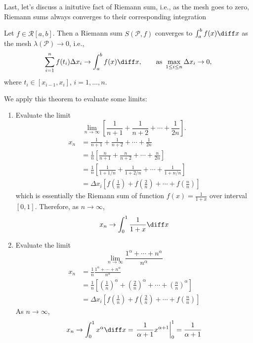 Last, let's discuss a initutive fact of Riemann sum, i.e., as the mesh goes to zero, Riemann sums always converges  to their corresponding integration
\begin{theorem}
Let $f\in\mathcal{R}[a,b]$. Then a Riemann sum $S(\mathcal{P},f)$ converges to $\int_a^bf(x)\diff x$ as the mesh $\lambda(\mathcal{P})\to0$, i.e.,
\[
\sum_{i=1}^nf(t_i)\Delta x_i\to\int_a^bf(x)\diff x,\qquad
\mbox{as }\max_{1\le i\le n}\Delta x_i\to0,
\]
where $t_i\in[x_{i-1},x_i]$, $i=1,\dots,n$.
\end{theorem}
We apply this theorem to evaluate some limits:
\begin{example}
\begin{enumerate}
\item
Evaluate the limit
\[
\lim_{n\to\infty}\left[\frac{1}{n+1}+\frac{1}{n+2}+\cdots+\frac{1}{2n}\right].
\]
\begin{align*}
x_n&=\frac{1}{n+1}+\frac{1}{n+2}+\cdots+\frac{1}{2n}\\
&=\frac{1}{n}\left[\frac{n}{n+1}+\frac{n}{n+2}+\cdots+\frac{n}{2n}\right]\\
&=\frac{1}{n}\left[
\frac{1}{1+1/n}+\frac{1}{1+2/n}+\cdots+\frac{1}{1+n/n}
\right]\\
&=\Delta x_i\left[
f(\frac{1}{n})+f(\frac{2}{n})+\cdots+f(\frac{n}{n})
\right]
\end{align*}
which is essentially the Riemann sum of function $f(x)=\frac{1}{1+x}$ over interval $[0,1]$. Therefore, as $n\to\infty$,
\[
x_n\to\int_0^1\frac{1}{1+x}\diff x
\]
\item
Evaluate the limit
\[
\lim_{n\to\infty}\frac{1^\alpha+\cdots+n^\alpha}{n^{\alpha}}
\]
\begin{align*}
x_n&=\frac{1}{n}\frac{1^\alpha+\cdots+n^\alpha}{n^{\alpha}}\\
&=\frac{1}{n}\left[(\frac{1}{n})^\alpha+(\frac{2}{n})^\alpha+\cdots+(\frac{n}{n})^\alpha\right]\\
&=\Delta x_i\left[
f(\frac{1}{n})+f(\frac{2}{n})+\cdots+f(\frac{n}{n})
\right]
\end{align*}
As $n\to\infty$,
\[
x_n\to\int_0^1x^\alpha\diff x=\left.\frac{1}{\alpha+1}x^{\alpha+1}\right|_0^1=\frac{1}{\alpha+1}
\]


\end{enumerate}
\end{example}
















